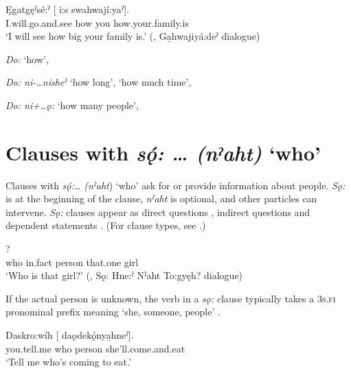 \ea\label{ex:doexx2} 
\gll Ęgatgęˀsé:ˀ [  i:s  swahwají:yaˀ].\\
I.will.go.and.see how you how.your.family.is\\
\glt ‘I will see how big your family is.’ (\cite[257]{mithun_watewayestanih_1984}, Ga̱hwajiyá:deˀ dialogue)
\z



\begin{CayugaRelated}
\item{}\textit{Do:} ‘how’, 

\item{}\textit{Do: ni-…nisheˀ} ‘how long’, ‘how much time’, 

\item{}\textit{Do: ni+…ǫ:} ‘how many people’, 
\end{CayugaRelated}


\section{Clauses with \textit{sǫ́: … (nˀaht)} ‘who’} \label{ch:Clauses with [sǫ́: … (nˀaht)] ‘who’}
Clauses with \textit{sǫ́:… (nˀaht}) ‘who’ ask for or provide information about people. \textit{Sǫ:} is at the beginning of the clause, \textit{nˀaht} is optional, and other particles can intervene. \textit{Sǫ:} clauses appear as direct questions , indirect questions  and dependent statements . (For clause types, see .)

\ea\label{ex:whquestex3} 
?\\
who in.fact person that.one girl\\
\glt ‘Who is that girl?’ (\cite[71]{mithun_watewayestanih_1984}, Sǫ: Hne:ˀ Nˀaht To:gyęh? dialogue)
\z

If the actual person is unknown, the verb in a \textit{sǫ:} clause typically takes a \textsc{3s.fi} pronominal prefix meaning ‘she, someone, people’ .

\ea\label{ex:whquestex4}
\gll Daskro:wíh [   daǫdekǫ́nya̱hneˀ]. \\
you.tell.me who person she’ll.come.and.eat\\
\glt ‘Tell me who’s coming to eat.’ 
\z

